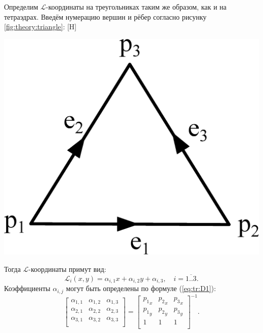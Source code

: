 \documentclass[a4paper,14pt]{article}
\makeatletter
\renewenvironment{figure}[1][\fps@figure]{
  \edef\@tempa{\noexpand\@float{figure}[#1]}
  \@tempa
  \addtocounter{foofigure}{1}
}{
  \end@float
}
\makeatother
\begin{document}
Определим $\mathcal{L}$-координаты на треугольниках таким же образом, как и на тетраэдрах. Введём нумерацию вершин и рёбер согласно рисунку \ref{fig:theory:triangle}:
\begin{figure}[H]
	\centering
	\includegraphics[scale=0.25]{theory/triangle.eps}
	\caption{треугольный конечный элемент}
	\label{fig:theory:triangle}
\end{figure}

\noindent Тогда $\mathcal{L}$-координаты примут вид:
\begin{equation*}
	\mathcal{L}_i (x, y) = \alpha_{i, 1} x + \alpha_{i, 2} y + \alpha_{i, 3} , \text{~~~} i = \overline{1..3} . \label{eq:tr:L}
\end{equation*}
Коэффициенты $\alpha_{i, j}$ могут быть определены по формуле (\ref{eq:tr:D1}):
\begin{equation}
	\left[
	\begin{matrix}
		\alpha_{1, 1} & \alpha_{1, 2} & \alpha_{1, 3} \\
		\alpha_{2, 1} & \alpha_{2, 2} & \alpha_{2, 3} \\
		\alpha_{3, 1} & \alpha_{3, 2} & \alpha_{3, 3} \\
	\end{matrix}
	\right] = \left[
	\begin{matrix}
		{p_1}_x & {p_2}_x & {p_3}_x \\
		{p_1}_y & {p_2}_y & {p_3}_y \\
		1 & 1 & 1 \\
	\end{matrix}
	\right]^{-1} . \label{eq:tr:D1}
\end{equation}
\end{document}
